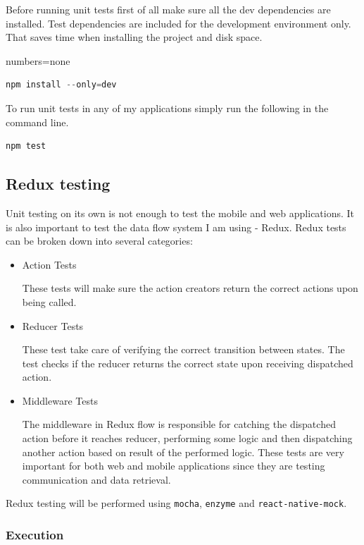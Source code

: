 \documentclass[thesis=M,english]{FITthesis}[2012/10/20]
\begin{document}
Before running unit tests first of all make sure all the dev dependencies are installed. Test dependencies are included for the development environment only. That saves time when installing the project and disk space.

{numbers=none}

\begin{lstlisting}[language=C, style=nonumbers]
 npm install --only=dev
\end{lstlisting}

To run unit tests in any of my applications simply run the following in the command line.

\begin{lstlisting}[language=C, style=nonumbers]
npm test
\end{lstlisting}

\subsection{Redux testing}

Unit testing on its own is not enough to test the mobile and web applications. It is also important to test the data flow system I am using - Redux.
Redux tests can be broken down into several categories: 
\begin{itemize}
	\item Action Tests
	
	These tests will make sure the action creators return the correct actions upon being called.
	\item Reducer Tests
	
	These test take care of verifying the correct transition between states. The test checks if the reducer returns the correct state upon receiving dispatched action.
	\item Middleware Tests
	
	The middleware in Redux flow is responsible for catching the dispatched action before it reaches reducer, performing some logic and then dispatching another action based on result of the performed logic. These tests are very important for both web and mobile applications since they are testing communication and data retrieval.
\end{itemize}

Redux testing will be performed using \verb|mocha|, \verb|enzyme| and \verb|react-native-mock|.

\subsubsection{Execution}
\end{document}
